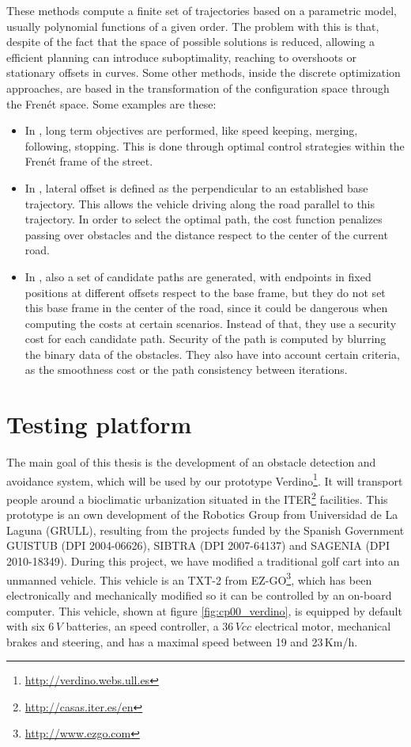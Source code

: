 These methods compute a finite set of trajectories based on a parametric model, usually polynomial functions of a given order. The problem with this is that, despite of the fact that the space of possible solutions is reduced, allowing a efficient planning can introduce suboptimality, reaching to overshoots or stationary offsets in curves.
Some other methods, inside the discrete optimization approaches, are based in the transformation of the configuration space through the Fren\'et space. Some examples are these:
\begin{itemize}
 \item In \cite{werling2010optimal}, long term objectives are performed, like speed keeping, merging, following, stopping. This is done through optimal control strategies within the Fren\'et frame of the street.
 \item In \cite{thrun2006stanley}, lateral offset is defined as the perpendicular to an established base trajectory. This allows the vehicle driving along the road parallel to this trajectory. In order to select the optimal path, the cost function penalizes passing over obstacles and the distance respect to the center of the current road.
 \item In \cite{chu2012local}, also a set of candidate paths are generated, with endpoints in fixed positions at different offsets respect to the base frame, but they do not set this base frame in the center of the road, since it could be dangerous when computing the costs at certain scenarios. Instead of that, they use a security cost for each candidate path. Security of the path is computed by blurring the binary data of the obstacles. They also have into account certain criteria, as the smoothness cost or the path consistency between iterations.
\end{itemize}

\section{Testing platform}\label{ch:chapter00_03}


The main goal of this thesis is the development of an obstacle detection and avoidance system, which will be used by our prototype Verdino\footnote{\url{http://verdino.webs.ull.es}}. It will transport people around a bioclimatic urbanization situated in the ITER\footnote{\url{http://casas.iter.es/en}} facilities. This prototype is an own development of the Robotics Group from Universidad de La Laguna (GRULL), resulting from the projects funded by the Spanish Government GUISTUB (DPI 2004-06626), SIBTRA (DPI 2007-64137) and SAGENIA (DPI 2010-18349). During this project, we have modified a traditional golf cart into an unmanned vehicle. 
This vehicle is an TXT-2 from EZ-GO\footnote{\url{http://www.ezgo.com}}, which has been electronically and mechanically modified so it can be controlled by an on-board computer. This vehicle, shown at figure \ref{fig:cp00_verdino}, is equipped by default with six $6\,V$ batteries, an speed controller, a $36\,Vcc$ electrical motor, mechanical brakes and steering, and has a maximal speed between 19 and 23\,Km/h.


